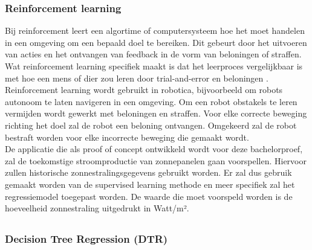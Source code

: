 \subsubsection{Reinforcement learning}

Bij reinforcement leert een algortime of computersysteem hoe het moet handelen in een omgeving om een bepaald doel te bereiken. Dit gebeurt door het uitvoeren van acties en het ontvangen van feedback in de vorm van beloningen of straffen. Wat reinforcement learning specifiek maakt is dat het leerproces vergelijkbaar is met hoe een mens of dier zou leren door trial-and-error en beloningen \autocite{Efimov2024}. \\

Reinforcement learning wordt gebruikt in robotica, bijvoorbeeld om robots autonoom te laten navigeren in een omgeving. Om een robot obstakels te leren vermijden wordt gewerkt met beloningen en straffen. Voor elke correcte beweging richting het doel zal de robot een beloning ontvangen. Omgekeerd zal de robot bestraft worden voor elke incorrecte beweging die gemaakt wordt. \\

\newpage
De applicatie die als proof of concept ontwikkeld wordt voor deze bachelorproef, zal de toekomstige stroomproductie van zonnepanelen gaan voorspellen. Hiervoor zullen historische zonnestralingsgegevens gebruikt worden. Er zal dus gebruik gemaakt worden van de supervised learning methode en meer specifiek zal het regressiemodel toegepast worden. De waarde die moet voorspeld worden is de hoeveelheid zonnestraling uitgedrukt in Watt/m².

\subsection{}%
\label{sec:supervised machine learning: regressie modellen}

\subsubsection{Decision Tree Regression (DTR)}

